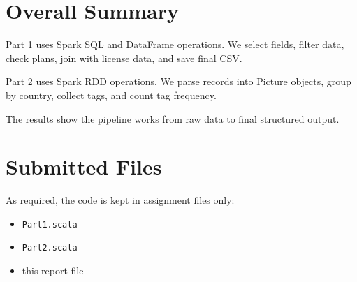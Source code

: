 \documentclass[11pt]{article}
\begin{document}
\section*{Overall Summary}
Part 1 uses Spark SQL and DataFrame operations. We select fields, filter data, check plans, join with license data, and save final CSV.

Part 2 uses Spark RDD operations. We parse records into Picture objects, group by country, collect tags, and count tag frequency.

The results show the pipeline works from raw data to final structured output.

\section*{Submitted Files}
As required, the code is kept in assignment files only:
\begin{itemize}
  \item \texttt{Part1.scala}
  \item \texttt{Part2.scala}
  \item this report file
\end{itemize}
\end{document}
